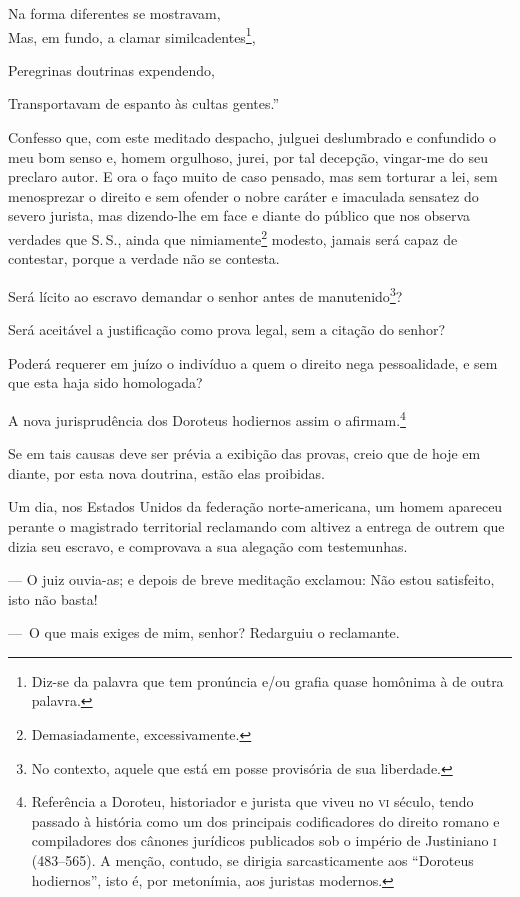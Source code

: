 Na forma diferentes se mostravam,\\
Mas, em fundo, a clamar similcadentes\footnote{Diz-se da palavra que
  tem pronúncia e/ou grafia quase homônima à de outra palavra.},

Peregrinas doutrinas expendendo,

Transportavam de espanto às cultas gentes.''

Confesso que, com este meditado despacho, julguei deslumbrado e
confundido o meu bom senso e, homem orgulhoso, jurei, por tal decepção,
vingar-me do seu preclaro autor. E ora o faço muito de caso pensado, mas
sem torturar a lei, sem menosprezar o direito e sem ofender o nobre
caráter e imaculada sensatez do severo jurista, mas dizendo-lhe em face
e diante do público que nos observa verdades que S.\,S., ainda que
nimiamente\footnote{Demasiadamente, excessivamente.} modesto, jamais
será capaz de contestar, porque a verdade não se contesta.

Será lícito ao escravo demandar o senhor antes de manutenido\footnote{
  No contexto, aquele que está em posse provisória de sua liberdade.}?

Será aceitável a justificação como prova legal, sem a citação do senhor?

Poderá requerer em juízo o indivíduo a quem o direito nega pessoalidade,
e sem que esta haja sido homologada?

A nova jurisprudência dos Doroteus hodiernos assim o afirmam.\footnote{
  Referência a Doroteu, historiador e jurista que viveu no \textsc{vi} século,
  tendo passado à história como um dos principais codificadores do
  direito romano e compiladores dos cânones jurídicos publicados sob o
  império de Justiniano \textsc{i} (483--565). A menção, contudo, se dirigia
  sarcasticamente aos ``Doroteus hodiernos'', isto é, por metonímia, aos
  juristas modernos.\label{doroteu}}

Se em tais causas deve ser prévia a exibição das provas, creio que de
hoje em diante, por esta nova doutrina, estão elas proibidas.

Um dia, nos Estados Unidos da federação norte-americana, um homem
apareceu perante o magistrado territorial reclamando com altivez a
entrega de outrem que dizia seu escravo, e comprovava a sua alegação com
testemunhas.

--- O juiz ouvia-as; e depois de breve meditação exclamou: Não estou
satisfeito, isto não basta!

---~O que mais exiges de mim, senhor? Redarguiu o reclamante.

